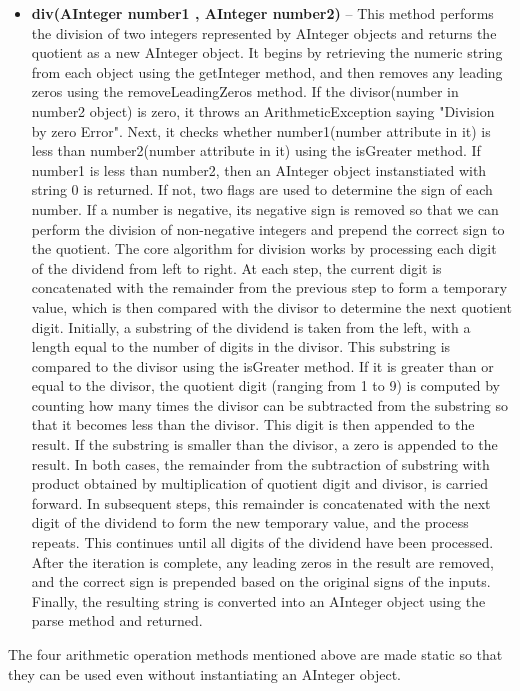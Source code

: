 \documentclass[a4paper,12pt]{article}
\begin{document}
\begin{itemize}
    \item \textbf{div(AInteger number1 , AInteger number2)} -- This method performs the division of two integers represented by AInteger objects and returns the quotient as a new AInteger object. It begins by retrieving the numeric string from each object using the getInteger method, and then removes any leading zeros using the removeLeadingZeros method. If the divisor(number in number2 object) is zero, it throws an ArithmeticException saying "Division by zero Error". Next, it checks whether number1(number attribute in it) is less than number2(number attribute in it) using the isGreater method. If number1 is less than number2, then an AInteger object instanstiated with string $0$ is returned. If not, two flags are used to determine the sign of each number. If a number is negative, its negative sign is removed so that we can perform the division of non-negative integers and prepend the correct sign to the quotient. The core algorithm for division works by processing each digit of the dividend from left to right. At each step, the current digit is concatenated with the remainder from the previous step to form a temporary value, which is then compared with the divisor to determine the next quotient digit. Initially, a substring of the dividend is taken from the left, with a length equal to the number of digits in the divisor. This substring is compared to the divisor using the isGreater method. If it is greater than or equal to the divisor, the quotient digit (ranging from 1 to 9) is computed by counting how many times the divisor can be subtracted from the substring so that it becomes less than the divisor. This digit is then appended to the result. If the substring is smaller than the divisor, a zero is appended to the result. In both cases, the remainder from the subtraction of substring with product obtained by multiplication of quotient digit and divisor, is carried forward. In subsequent steps, this remainder is concatenated with the next digit of the dividend to form the new temporary value, and the process repeats. This continues until all digits of the dividend have been processed. After the iteration is complete, any leading zeros in the result are removed, and the correct sign is prepended based on the original signs of the inputs. Finally, the resulting string is converted into an AInteger object using the parse method and returned.\\
\end{itemize}
The four arithmetic operation methods mentioned above are made static so that they can be used even without instantiating an AInteger object.
\end{document}
